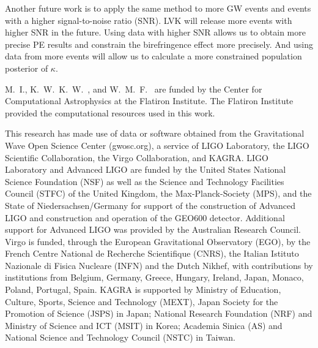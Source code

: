 \documentclass[aps,prd,twocolumn,superscriptaddress,preprintnumbers,floatfix,nofootinbib]{revtex4-2}
\begin{document}
Another future work is to apply the same method to more GW events and events with a higher signal-to-noise ratio (SNR).
LVK will release more events with higher SNR in the future.
Using data with higher SNR allows us to obtain more precise PE results and constrain the birefringence effect more precisely.
And using data from more events will allow us to calculate a more constrained population posterior of $\kappa$.

\begin{acknowledgments}
M.~I., K.~W.~K.~W.~, and W.~M.~F.~ are funded by the Center for Computational Astrophysics at the Flatiron Institute.
The Flatiron Institute provided the computational resources used in this work.

This research has made use of data or software obtained from the Gravitational Wave Open Science Center (gwosc.org), a service of LIGO Laboratory, the LIGO Scientific Collaboration, the Virgo Collaboration, and KAGRA.
LIGO Laboratory and Advanced LIGO are funded by the United States National Science Foundation (NSF) as well as the Science and Technology Facilities Council (STFC) of the United Kingdom, the Max-Planck-Society (MPS), and the State of Niedersachsen/Germany for support of the construction of Advanced LIGO and construction and operation of the GEO600 detector.
Additional support for Advanced LIGO was provided by the Australian Research Council.
Virgo is funded, through the European Gravitational Observatory (EGO), by the French Centre National de Recherche Scientifique (CNRS), the Italian Istituto Nazionale di Fisica Nucleare (INFN) and the Dutch Nikhef, with contributions by institutions from Belgium, Germany, Greece, Hungary, Ireland, Japan, Monaco, Poland, Portugal, Spain.
KAGRA is supported by Ministry of Education, Culture, Sports, Science and Technology (MEXT), Japan Society for the Promotion of Science (JSPS) in Japan; National Research Foundation (NRF) and Ministry of Science and ICT (MSIT) in Korea; Academia Sinica (AS) and National Science and Technology Council (NSTC) in Taiwan.
\end{acknowledgments}


\end{document}
